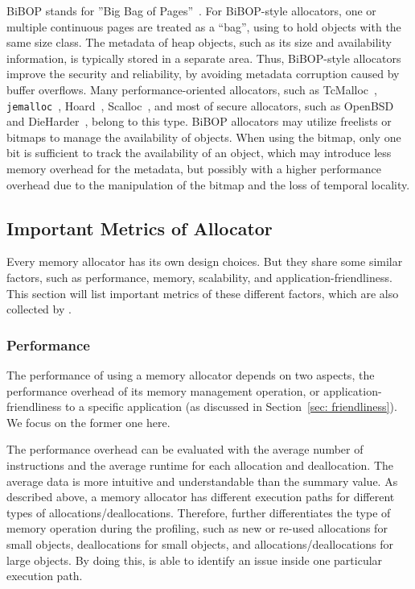 BiBOP stands for ''Big Bag of Pages''~\citep{hanson1980}. For BiBOP-style allocators, one or multiple continuous pages are treated as a ``bag'', using to hold objects with the same size class. The metadata of heap objects, such as its size and availability information, is typically stored in a separate area. Thus, BiBOP-style allocators improve the security and reliability, by avoiding metadata corruption caused by buffer overflows. Many performance-oriented allocators, such as TcMalloc~\citep{tcmalloc}, \texttt{jemalloc}~\citep{jemalloc}, Hoard~\citep{Hoard}, Scalloc~\citep{Scalloc}, and most of secure allocators, such as OpenBSD~\citep{OpenBSD} and DieHarder~\citep{DieHarder}, belong to this type. BiBOP allocators may utilize freelists or bitmaps to manage the availability of objects. When using the bitmap, only one bit is sufficient to track the availability of an object, which may introduce less memory overhead for the metadata, but possibly with a higher performance overhead due to the manipulation of the bitmap and the loss of temporal locality.  


\subsection{Important Metrics of Allocator}

\label{sec:factors}

Every memory allocator has its own design choices. But they share some similar factors, such as performance, memory, scalability, and application-friendliness. This section will list important metrics of these different factors, which are also collected by \MP{}. 

\subsubsection{Performance}
\label{sec:performance}

The performance of using a memory allocator depends on two aspects, the performance overhead of its memory management operation, or application-friendliness to a specific application (as discussed in Section~\ref{sec: friendliness}). We focus on the former one here. 

The performance overhead can be evaluated with the average number of instructions and the average runtime for each allocation and deallocation. The average data is more intuitive and understandable than the summary value. As described above, a memory allocator has different execution paths for different types of allocations/deallocations. Therefore, \MP{} further differentiates the type of memory operation during the profiling, such as new or re-used allocations for small objects, deallocations for small objects, and allocations/deallocations for large objects. By doing this, \MP{} is able to identify an issue inside one particular execution path. 


